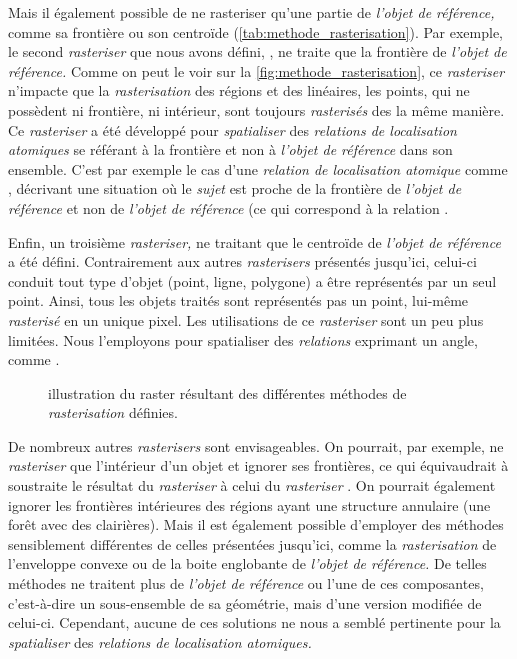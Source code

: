 Mais il également possible de ne rasteriser qu'une partie de
\emph{l'objet de référence,} comme sa frontière ou son centroïde
(\autoref{tab:methode_rasterisation}). Par exemple, le second
\emph{rasteriser} que nous avons défini, , ne traite
que la frontière de \emph{l'objet de référence.} Comme on peut le voir
sur la \autoref{fig:methode_rasterisation}, ce \emph{rasteriser}
n'impacte que la \emph{rasterisation} des régions et des linéaires,
les points, qui ne possèdent ni frontière, ni intérieur, sont toujours
\emph{rasterisés} des la même manière. Ce \emph{rasteriser} a été
développé pour \emph{spatialiser} des \emph{relations de localisation
  atomiques} se référant à la frontière et non à \emph{l'objet de
  référence} dans son ensemble. C'est par exemple le cas d'une
\emph{relation de localisation atomique} comme
, décrivant une situation où le
\emph{sujet} est proche de la frontière de \emph{l'objet de référence}
et non de \emph{l'objet de référence} (ce qui correspond à la relation
.

Enfin, un troisième \emph{rasteriser,} ne traitant que le centroïde de
\emph{l'objet de référence} a été défini. Contrairement aux autres
\emph{rasterisers} présentés jusqu'ici, celui-ci conduit tout type
d'objet (\ie point, ligne, polygone) a être représentés par un seul
point. Ainsi, tous les objets traités sont représentés pas un point,
lui-même \emph{rasterisé} en un unique pixel. Les utilisations de ce
\emph{rasteriser} sont un peu plus limitées. Nous l'employons pour
spatialiser des \emph{relations} exprimant un angle, comme
.

\begin{figure}
  \centering
  
  \caption{illustration du raster résultant des différentes méthodes
    de \emph{rasterisation} définies.}
  \label{fig:methode_rasterisation}
\end{figure}

De nombreux autres \emph{rasterisers} sont envisageables. On pourrait,
par exemple, ne \emph{rasteriser} que l'intérieur d'un objet et
ignorer ses frontières, ce qui équivaudrait à soustraite le résultat
du \emph{rasteriser}  à celui du \emph{rasteriser}
. On pourrait également ignorer les frontières
intérieures des régions ayant une structure annulaire (\eg une forêt
avec des clairières). Mais il est également possible d'employer des
méthodes sensiblement différentes de celles présentées jusqu'ici,
comme la \emph{rasterisation} de l'enveloppe convexe ou de la boite
englobante de \emph{l'objet de référence.} De telles méthodes ne
traitent plus de \emph{l'objet de référence} ou l'une de ces
composantes, c'est-à-dire un sous-ensemble de sa géométrie, mais d'une
version modifiée de celui-ci. Cependant, aucune de ces solutions ne
nous a semblé pertinente pour la \emph{spatialiser} des
\emph{relations de localisation atomiques.}

